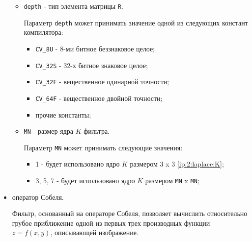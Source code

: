 \begin{itemize}
	\begin{itemize}

		\item \verb|depth| - тип элемента матрицы \verb|R|.
		
		Параметр \verb|depth| может принимать значение одной из следующих констант компилятора:

		\begin{itemize}

			\item \verb|CV_8U| - 8-ми битное беззнаковое целое;
			\item \verb|CV_32S| - 32-х битное знаковое целое;
			\item \verb|CV_32F| - вещественное одинарной точности;
			\item \verb|CV_64F| - вещественное двойной точности;
			\item прочие константы;

		\end{itemize}

		\item \verb|MN| - размер ядра $K$ фильтра.

		Параметр \verb|MN| может принимать следующие значения:

		\begin{itemize}

			\item 1 - будет использовано ядро $K$ размером 3 x 3 \eqref{ip:2:laplace:K};
			\item 3, 5, 7 - будет использовано ядро $K$ размером \verb|MN| x \verb|MN|;

		\end{itemize}

	\end{itemize}

	\item оператор Собеля.

	Фильтр, основанный на операторе Собеля, позволяет вычислить относительно грубое приближение одной из первых трех производных функции $z = f(x, y)$, описывающей изображение.


\end{itemize}
